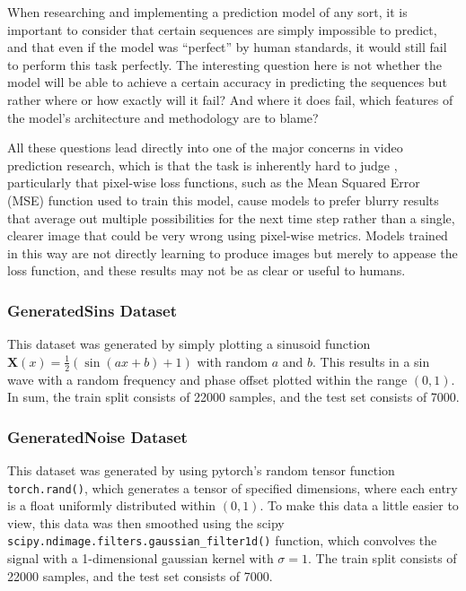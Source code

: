 \documentclass{scrartcl}
\begin{document}
When researching and implementing a prediction model of any sort, it is
important to consider that certain sequences are simply impossible to predict,
and that even if the model was ``perfect'' by human standards, it would still
fail to perform this task perfectly. The interesting question here is not
whether the model will be able to achieve a certain accuracy in predicting the
sequences but rather where or how exactly will it fail? And where it does fail,
which features of the model's architecture and methodology are to blame?

All these questions lead directly into one of the major concerns in video
prediction research, which is that the task is inherently hard to judge
\cite{video_prediction_survey}, particularly that pixel-wise loss functions,
such as the Mean Squared Error (MSE) function used to train this model, cause
models to prefer blurry results that average out multiple possibilities for the
next time step rather than a single, clearer image that could be very wrong
using pixel-wise metrics. Models trained in this way are not directly learning
to produce images but merely to appease the loss function, and these results
may not be as clear or useful to humans.


\subsubsection{GeneratedSins Dataset}
\label{subsubsec:generatedsins_intro}

This dataset was generated by simply plotting a sinusoid function
$\boldsymbol{X} (x) = \frac{1}{2} ( \sin (a x + b) + 1)$ with random $a$ and
$b$. This results in a sin wave with a random frequency and phase offset
plotted within the range $(0, 1)$. In sum, the train split consists of 22000
samples, and the test set consists of 7000.


\subsubsection{GeneratedNoise Dataset}
\label{subsubsec:generatednoise_intro}

This dataset was generated by using pytorch's random tensor function
\lstinline{torch.rand()}, which generates a tensor of specified dimensions,
where each entry is a float uniformly distributed within $(0, 1)$. To make this
data a little easier to view, this data was then smoothed using the scipy
\lstinline{scipy.ndimage.filters.gaussian_filter1d()} function, which convolves
the signal with a 1-dimensional gaussian kernel with $\sigma = 1$. The train
split consists of 22000 samples, and the test set consists of 7000.
\end{document}
